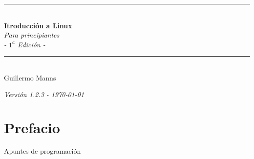 \documentclass[12pt,openany]{book}
\begin{document}
\begin{titlepage}
    \begin{center}
        \vspace*{0.9cm}

        \rule{0.8\textwidth}{1.2pt}\\[0.7cm]

        {\Huge\bfseries\color{azulportada} Itroducción a Linux}\\[0.7cm]

        {\Large\itshape\color{azulportada} Para principiantes}\\[0.7cm]

        {\Large\itshape - $1^{a}$ Edición -}\\[0.7cm]


        \rule{0.8\textwidth}{1.2pt}\\[1cm]

        {\huge Guillermo Manns}\\[0.5cm]

        \vspace{1cm}


    \end{center}
\end{titlepage}

\renewcommand{\contentsname}{Contenido}
\tableofcontents

\newpage
\begin{center}
    \vspace{1cm}
    \textit{Versión 1.2.3 - \today}
\end{center}

\chapter*{Prefacio}
Apuntes de programación
\end{document}

